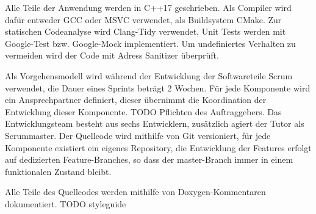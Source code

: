 Alle Teile der Anwendung werden in C++17 geschrieben. Als Compiler wird dafür entweder GCC oder MSVC verwendet, als Buildsystem CMake.
Zur statischen Codeanalyse wird Clang-Tidy verwendet, Unit Tests werden mit Google-Test bzw. Google-Mock implementiert.
Um undefiniertes Verhalten zu vermeiden wird der Code mit Adress Sanitizer überprüft.

Als Vorgehensmodell wird während der Entwicklung der Softwareteile Scrum verwendet, die Dauer eines Sprints beträgt 2 Wochen. Für jede Komponente wird ein Ansprechpartner definiert, dieser übernimmt die Koordination der Entwicklung dieser Komponente. TODO Pflichten des Auftraggebers. 
Das Entwicklungsteam besteht aus sechs Entwicklern, zusätzlich agiert der Tutor als Scrummaster. Der Quellcode wird mithilfe von Git versioniert, für jede Komponente existiert ein eigenes Repository, die Entwicklung der Features erfolgt auf dedizierten Feature-Branches, so dass der master-Branch immer in einem funktionalen Zustand bleibt.

Alle Teile des Quellcodes werden mithilfe von Doxygen-Kommentaren dokumentiert. TODO styleguide

